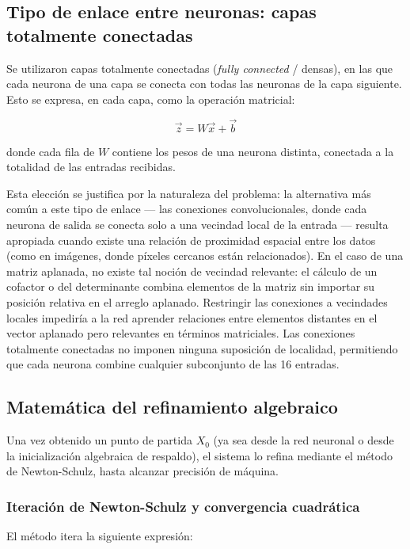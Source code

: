 \documentclass[12pt,a4paper]{article}
\begin{document}
\subsection{Tipo de enlace entre neuronas: capas totalmente conectadas}

Se utilizaron capas totalmente conectadas (\textit{fully connected} / densas), en las que cada neurona de una capa se conecta con todas las neuronas de la capa siguiente. Esto se expresa, en cada capa, como la operación matricial:

\[
    \vec{z} = W\vec{x} + \vec{b}
\]

donde cada fila de $W$ contiene los pesos de una neurona distinta, conectada a la totalidad de las entradas recibidas.

Esta elección se justifica por la naturaleza del problema: la alternativa más común a este tipo de enlace --- las conexiones convolucionales, donde cada neurona de salida se conecta solo a una vecindad local de la entrada --- resulta apropiada cuando existe una relación de proximidad espacial entre los datos (como en imágenes, donde píxeles cercanos están relacionados). En el caso de una matriz aplanada, no existe tal noción de vecindad relevante: el cálculo de un cofactor o del determinante combina elementos de la matriz sin importar su posición relativa en el arreglo aplanado. Restringir las conexiones a vecindades locales impediría a la red aprender relaciones entre elementos distantes en el vector aplanado pero relevantes en términos matriciales. Las conexiones totalmente conectadas no imponen ninguna suposición de localidad, permitiendo que cada neurona combine cualquier subconjunto de las 16 entradas.

\subsection{Matemática del refinamiento algebraico}

Una vez obtenido un punto de partida $X_0$ (ya sea desde la red neuronal o desde la inicialización algebraica de respaldo), el sistema lo refina mediante el método de Newton-Schulz, hasta alcanzar precisión de máquina.

\subsubsection{Iteración de Newton-Schulz y convergencia cuadrática}

El método itera la siguiente expresión:
\end{document}
